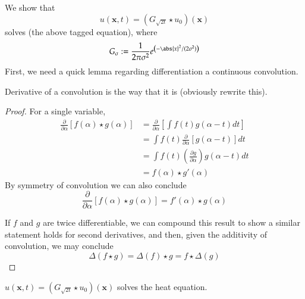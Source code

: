	We show that
	\begin{equation}
		u(\bm{x},t) = \left(G_{\sqrt{2t}} \star u_0 \right)(\bm{x})
	\end{equation}
	solves (the above tagged equation), where
	\[
		G_\sigma := \frac{1}{2\pi \sigma^2} e^{\left(-\abs{x}^2 / (2\sigma^2)\right)}
	\]
	First, we need a quick lemma regarding differentiation a continuous convolution.
	\begin{lemma} \label{dconvolution}
		Derivative of a convolution is the way that it is (obviously rewrite this).
	\end{lemma}
	\begin{proof}
		For a single variable,
		\begin{align}
		\frac{\partial}{\partial \alpha} \left[ f(\alpha) \star g(\alpha) \right]
		&= \frac{\partial}{\partial \alpha} \left[ 
		\int f(t) g(\alpha - t) dt \right] \\
		&=  \int f(t) \frac{\partial}{\partial \alpha}\left[ g(\alpha - t)  \right] dt \\
		&=  \int f(t) \left(\frac{\partial g}{\partial \alpha}\right) g(\alpha - t) dt \\
		&=  f(\alpha) \star g'(\alpha)
		\end{align}
		By symmetry of convolution we can also conclude 
		\[\frac{\partial}{\partial \alpha} \left[ f(\alpha) \star g(\alpha) \right]
		= f'(\alpha) \star g(\alpha)
		\]
		
		If $f$ and $g$ are twice differentiable, we can compound this result to show a similar statement holds for second derivatives, and then, given the additivity of convolution,
		we may conclude
		\begin{equation}
		\Delta \left(f \star g \right) = \Delta(f) \star g = f \star \Delta(g) 
		\end{equation} 
	\end{proof}
	\begin{theorem}
		$u(\bm{x},t) = \left(G_{\sqrt{2t}} \star u_0 \right)(\bm{x})$ solves the heat equation.
	\end{theorem}
